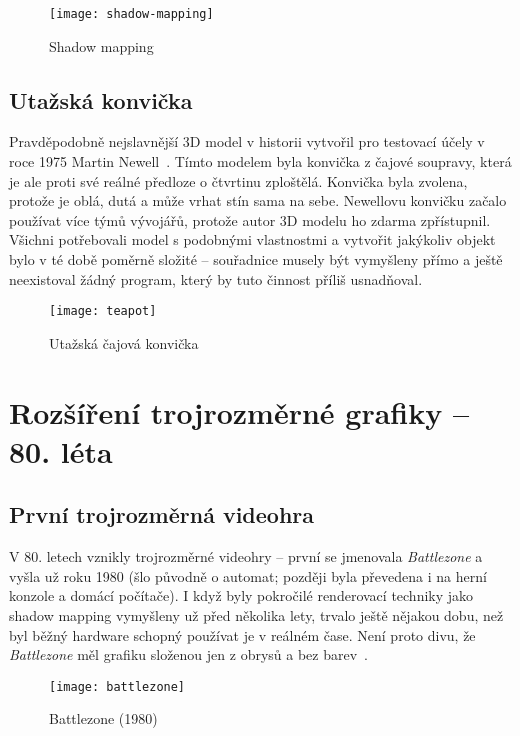\documentclass[a4paper, 11pt]{report}
\begin{document}
\begin{chapterwithoutpagebreak}
\begin{figure}[h]
    \centering
    \texttt{[image: shadow-mapping]}
    \caption[Shadow mapping]{Shadow mapping~\cite{pic:shadow-mapping}}
\end{figure}

\section{Utažská konvička}
Pravděpodobně nejslavnější 3D model v historii vytvořil pro testovací účely v roce 1975 Martin Newell~\cite{historyoi:teapot}. Tímto modelem byla konvička z čajové soupravy, která je ale proti své reálné předloze o čtvrtinu zploštělá. Konvička byla zvolena, protože je oblá, dutá a může vrhat stín sama na sebe. Newellovu konvičku začalo používat více týmů vývojářů, protože autor 3D modelu ho zdarma zpřístupnil. Všichni potřebovali model s podobnými vlastnostmi a vytvořit jakýkoliv objekt bylo v té době poměrně složité -- souřadnice musely být vymyšleny přímo a ještě neexistoval žádný program, který by tuto činnost příliš usnadňoval.

\begin{figure}[H]
    \centering
    \texttt{[image: teapot]}
    \caption{Utažská čajová konvička}
\end{figure}

\chapter{Rozšíření trojrozměrné grafiky -- 80. léta}
\section{První trojrozměrná videohra}
V 80. letech vznikly trojrozměrné videohry -- první se jmenovala \emph{Battlezone} a vyšla už roku 1980 (šlo původně o automat; později byla převedena i na herní konzole a domácí počítače). I když byly pokročilé renderovací techniky jako shadow mapping vymyšleny už před několika lety, trvalo ještě nějakou dobu, než byl běžný hardware schopný používat je v reálném čase. Není proto divu, že \emph{Battlezone} měl grafiku složenou jen z obrysů a bez barev~\cite{gamewiki:battlezone}.

\begin{figure}[H]
    \centering
    \texttt{[image: battlezone]}
    \caption[Battlezone (1980)]{Battlezone (1980)~\cite{pic:battlezone}}
\end{figure}


\end{chapterwithoutpagebreak}
\end{document}
